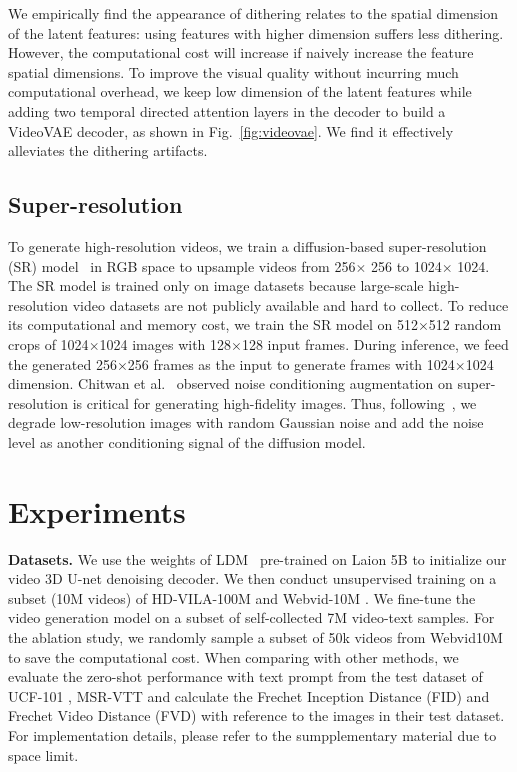 \documentclass[10pt,twocolumn,letterpaper]{article}
\newcommand{\myPara}[1]{\vspace{6pt}\noindent\textbf{#1}}
\begin{document}
We empirically find the appearance  of dithering   relates to the spatial dimension of the latent features:  using  features with higher   dimension suffers   less     dithering. However, the computational cost will increase if naively increase  the feature spatial dimensions. To improve the visual quality without incurring  much computational overhead, we keep   low dimension of the latent features while adding two   temporal directed attention layers in the decoder   to build a VideoVAE decoder, as shown in Fig.~\ref{fig:videovae}.  We find it effectively alleviates the dithering artifacts. 

\subsection{Super-resolution}
\label{subsec:super_res}
To generate high-resolution videos, we train a diffusion-based super-resolution (SR) model~\cite{saharia2022image} in RGB space to upsample videos from 256$\times$ 256 to 1024$\times$ 1024. The SR model is trained only on image datasets because large-scale high-resolution video datasets are not publicly available and   hard to collect. 
To reduce its computational and memory cost, we train the SR model on 512$\times$512 random crops of 1024$\times$1024 images with 128$\times$128 input frames. During inference, we feed the generated 256$\times$256 frames as the input to generate frames with 1024$\times$1024   dimension. Chitwan et al.~\cite{saharia2022photorealistic} observed noise conditioning augmentation on super-resolution is critical for generating high-fidelity images. Thus, following~\cite{saharia2022photorealistic}, we degrade low-resolution images with  random Gaussian noise   and add the noise level as another conditioning signal of the diffusion model.





 
\section{Experiments}
\label{sec:exp}

\myPara{Datasets.} We use the weights of LDM~\cite{rombach2022high} pre-trained on Laion 5B \cite{laion5b} to initialize  our video 3D U-net denoising decoder. We then conduct unsupervised training on a subset (10M videos) of HD-VILA-100M \cite{xue2022advancing} and Webvid-10M \cite{bain2021frozen}. We fine-tune the video generation model on a subset of self-collected 7M video-text samples. For the ablation study, we randomly sample a subset of 50k videos from Webvid10M to save the computational cost. When comparing with other methods, we evaluate the zero-shot   performance with text prompt from the test dataset of UCF-101 \cite{soomro2012ucf101}, MSR-VTT \cite{xu2016msr} and calculate the Frechet Inception Distance (FID) \cite{parmar2021cleanfid} and Frechet Video Distance (FVD) \cite{unterthiner2019fvd} with reference to the images in their test dataset. For implementation details, please refer to the sumpplementary material due to space limit.
\end{document}
